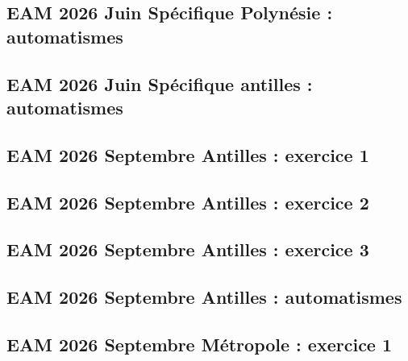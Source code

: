 \documentclass[lang=fr,edition=teacher,layout=sheet]{mxbook}
\begin{document}
\subsection*{EAM 2026 Juin Spécifique Polynésie : automatismes}
\begingroup\endgroup
\par\bigskip
{}\subsection*{EAM 2026 Juin Spécifique antilles : automatismes}
\begingroup\endgroup
\par\bigskip
{}\subsection*{EAM 2026 Septembre Antilles : exercice 1}
\begingroup\endgroup
\par\bigskip
{}\subsection*{EAM 2026 Septembre Antilles : exercice 2}
\begingroup\endgroup
\par\bigskip
{}\subsection*{EAM 2026 Septembre Antilles : exercice 3}
\begingroup\endgroup
\par\bigskip
{}\subsection*{EAM 2026 Septembre Antilles : automatismes}
\begingroup\endgroup
\par\bigskip
{}\subsection*{EAM 2026 Septembre Métropole : exercice 1}
\end{document}
